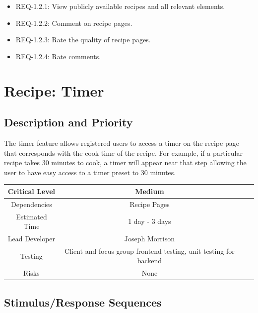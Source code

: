 \documentclass{scrreprt}
\begin{document}
\begin{itemize}
    \item REQ-1.2.1: View publicly available recipes and all relevant elements.
    \item REQ-1.2.2: Comment on recipe pages.
    \item REQ-1.2.3: Rate the quality of recipe pages.
    \item REQ-1.2.4: Rate comments.
\end{itemize}

\section{Recipe: Timer}

\subsection{Description and Priority}

The timer feature allows registered users to access a timer on the recipe page that corresponds with the cook time of the recipe. For example, if a particular recipe takes 30 minutes to cook, a timer will appear near that step allowing the user to have easy access to a timer preset to 30 minutes.

\begin{center}
    \begin{tabular}{| c | c | c | c |}
        \hline
        Critical Level & Medium                                                            \\
        \hline
        Dependencies   & Recipe Pages                                                      \\
        \hline
        Estimated Time & 1 day - 3 days                                                    \\
        \hline
        Lead Developer & Joseph Morrison                                                   \\
        \hline
        Testing        & Client and focus group frontend testing, unit testing for backend \\
        \hline
        Risks          & None                                                              \\
        \hline
    \end{tabular}
\end{center}

\subsection{Stimulus/Response Sequences}
\end{document}

